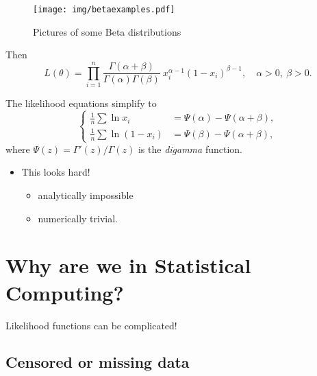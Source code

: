 \documentclass[captions=tableheading]{scrbook}
\begin{document}
\begin{itemize}
\begin{center}

\begin{figure}[h!]
\centering
\texttt{[image: img/betaexamples.pdf]}
\caption{Pictures of some Beta distributions}
\end{figure}

\end{center}

Then 
\[
L(\theta) = \prod_{i=1}^{n}\frac{\Gamma(\alpha+\beta)}{\Gamma(\alpha)\Gamma(\beta)}\: x_{i}^{\alpha-1}(1-x_{i})^{\beta-1}, \quad \alpha > 0,\ \beta > 0.
\]

The likelihood equations simplify to
\[
\begin{cases}
\frac{1}{n}\sum\ln x_{i} & =\Psi(\alpha)-\Psi(\alpha+\beta),\\
\frac{1}{n}\sum\ln(1-x_{i}) & =\Psi(\beta)-\Psi(\alpha+\beta),
\end{cases}
\]
where $\Psi(z)=\Gamma'(z)/\Gamma(z)$ is the \emph{digamma} function.


\begin{itemize}
\item This looks hard!
\begin{itemize}
\item analytically impossible
\item numerically trivial.
\end{itemize}
\end{itemize}

\end{itemize} %
\section{Why are we in Statistical Computing?}
\label{sec-1_2}


Likelihood functions can be complicated!
\subsection{Censored or missing data}
\label{sec-1_2_1}
\end{document}
